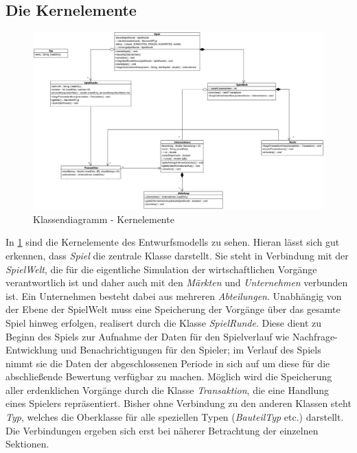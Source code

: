 \subsection{Die Kernelemente}
\begin{figure}[ht]
     \centering
     \includegraphics[width=\textwidth]{30_Fachkonzept/20_Entwurf/kern}
     \caption{Klassendiagramm - Kernelemente}
     \label{img:fachkonzept-entwurf-kern}
\end{figure}

In \ref{img:fachkonzept-entwurf-kern} sind die Kernelemente des Entwurfsmodells zu sehen. Hieran lässt sich gut erkennen, dass \textit{Spiel} die zentrale Klasse darstellt. Sie steht in Verbindung mit der \textit{SpielWelt}, die für die eigentliche Simulation der wirtschaftlichen Vorgänge verantwortlich ist und daher auch mit den \textit{Märkten} und \textit{Unternehmen} verbunden ist. Ein Unternehmen besteht dabei aus mehreren \textit{Abteilungen}. Unabhängig von der Ebene der SpielWelt muss eine Speicherung der Vorgänge über das gesamte Spiel hinweg erfolgen, realisert durch die Klasse \textit{SpielRunde}. Diese dient zu Beginn des Spiels zur Aufnahme der Daten für den Spielverlauf wie Nachfrage-Entwicklung und Benachrichtigungen für den Spieler; im Verlauf des Spiels nimmt sie die Daten der abgeschlossenen Periode in sich auf um diese für die abschließende Bewertung verfügbar zu machen. Möglich wird die Speicherung aller erdenklichen Vorgänge durch die Klasse \textit{Transaktion}, die eine Handlung eines Spielers repräsentiert. Bisher ohne Verbindung zu den anderen Klassen steht \textit{Typ}, welches die Oberklasse für alle speziellen Typen (\textit{BauteilTyp} etc.) darstellt. Die Verbindungen ergeben sich erst bei näherer Betrachtung der einzelnen Sektionen.

